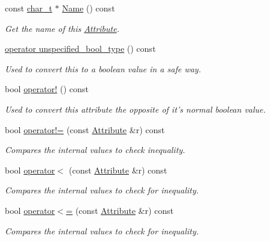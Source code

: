 \begin{DoxyCompactItemize}
const \hyperlink{namespacephys_1_1xml_afc87705cd1c2917d87b879715a2d8f6e}{char\_\-t} $\ast$ \hyperlink{classphys_1_1xml_1_1Attribute_ab4c1186366d975d2086bf81df2ce1135}{Name} () const 
\begin{DoxyCompactList}\small\item\em Get the name of this \hyperlink{classphys_1_1xml_1_1Attribute}{Attribute}. \item\end{DoxyCompactList}\item 
\hyperlink{classphys_1_1xml_1_1Attribute_a95fb020caed5a4ec9a5248fe38d6f345}{operator unspecified\_\-bool\_\-type} () const 
\begin{DoxyCompactList}\small\item\em Used to convert this to a boolean value in a safe way. \item\end{DoxyCompactList}\item 
bool \hyperlink{classphys_1_1xml_1_1Attribute_a18cb9f6900b0fc9e246b36d90e5bea5b}{operator!} () const 
\begin{DoxyCompactList}\small\item\em Used to convert this attribute the opposite of it's normal boolean value. \item\end{DoxyCompactList}\item 
bool \hyperlink{classphys_1_1xml_1_1Attribute_ae2371203e07dd781d2b38ba403b00816}{operator!=} (const \hyperlink{classphys_1_1xml_1_1Attribute}{Attribute} \&r) const 
\begin{DoxyCompactList}\small\item\em Compares the internal values to check inequality. \item\end{DoxyCompactList}\item 
bool \hyperlink{classphys_1_1xml_1_1Attribute_ac383f0c514e550fe992b1c0a0f3cbd7a}{operator$<$} (const \hyperlink{classphys_1_1xml_1_1Attribute}{Attribute} \&r) const 
\begin{DoxyCompactList}\small\item\em Compares the internal values to check for inequality. \item\end{DoxyCompactList}\item 
bool \hyperlink{classphys_1_1xml_1_1Attribute_a3b73bd409a2b6b9a7d72c3affc96bae1}{operator$<$=} (const \hyperlink{classphys_1_1xml_1_1Attribute}{Attribute} \&r) const 
\begin{DoxyCompactList}\small\item\em Compares the internal values to check for inequality. \item\end{DoxyCompactList}\item 

\end{DoxyCompactItemize}
